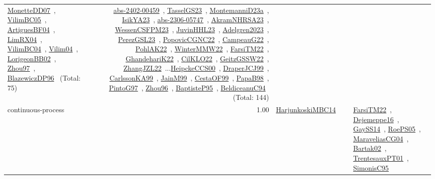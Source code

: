 {\begin{longtable}{p{3cm}r>{\raggedright\arraybackslash}p{6cm}>{\raggedright\arraybackslash}p{6cm}>{\raggedright\arraybackslash}p{8cm}}
\href{../works/MonetteDD07.pdf}{MonetteDD07}~\cite{MonetteDD07}, \href{../works/VilimBC05.pdf}{VilimBC05}~\cite{VilimBC05}, \href{../works/ArtiguesBF04.pdf}{ArtiguesBF04}~\cite{ArtiguesBF04}, \href{../works/LimRX04.pdf}{LimRX04}~\cite{LimRX04}, \href{../works/VilimBC04.pdf}{VilimBC04}~\cite{VilimBC04}, \href{../works/Vilim04.pdf}{Vilim04}~\cite{Vilim04}, \href{../works/LorigeonBB02.pdf}{LorigeonBB02}~\cite{LorigeonBB02}, \href{../works/Zhou97.pdf}{Zhou97}~\cite{Zhou97}, \href{../works/BlazewiczDP96.pdf}{BlazewiczDP96}~\cite{BlazewiczDP96} (Total: 75) & \href{../works/abs-2402-00459.pdf}{abs-2402-00459}~\cite{abs-2402-00459}, \href{../works/TasselGS23.pdf}{TasselGS23}~\cite{TasselGS23}, \href{../works/MontemanniD23a.pdf}{MontemanniD23a}~\cite{MontemanniD23a}, \href{../works/IsikYA23.pdf}{IsikYA23}~\cite{IsikYA23}, \href{../works/abs-2306-05747.pdf}{abs-2306-05747}~\cite{abs-2306-05747}, \href{../works/AkramNHRSA23.pdf}{AkramNHRSA23}~\cite{AkramNHRSA23}, \href{../works/WessenCSFPM23.pdf}{WessenCSFPM23}~\cite{WessenCSFPM23}, \href{../works/JuvinHHL23.pdf}{JuvinHHL23}~\cite{JuvinHHL23}, \href{../works/Adelgren2023.pdf}{Adelgren2023}~\cite{Adelgren2023}, \href{../works/PerezGSL23.pdf}{PerezGSL23}~\cite{PerezGSL23}, \href{../works/PopovicCGNC22.pdf}{PopovicCGNC22}~\cite{PopovicCGNC22}, \href{../works/CampeauG22.pdf}{CampeauG22}~\cite{CampeauG22}, \href{../works/PohlAK22.pdf}{PohlAK22}~\cite{PohlAK22}, \href{../works/WinterMMW22.pdf}{WinterMMW22}~\cite{WinterMMW22}, \href{../works/FarsiTM22.pdf}{FarsiTM22}~\cite{FarsiTM22}, \href{../works/GhandehariK22.pdf}{GhandehariK22}~\cite{GhandehariK22}, \href{../works/CilKLO22.pdf}{CilKLO22}~\cite{CilKLO22}, \href{../works/GeitzGSSW22.pdf}{GeitzGSSW22}~\cite{GeitzGSSW22}, \href{../works/ZhangJZL22.pdf}{ZhangJZL22}~\cite{ZhangJZL22}...\href{../works/HeipckeCCS00.pdf}{HeipckeCCS00}~\cite{HeipckeCCS00}, \href{../works/DraperJCJ99.pdf}{DraperJCJ99}~\cite{DraperJCJ99}, \href{../works/CarlssonKA99.pdf}{CarlssonKA99}~\cite{CarlssonKA99}, \href{../works/JainM99.pdf}{JainM99}~\cite{JainM99}, \href{../works/CestaOF99.pdf}{CestaOF99}~\cite{CestaOF99}, \href{../works/PapaB98.pdf}{PapaB98}~\cite{PapaB98}, \href{../works/PintoG97.pdf}{PintoG97}~\cite{PintoG97}, \href{../works/Zhou96.pdf}{Zhou96}~\cite{Zhou96}, \href{../works/BaptisteP95.pdf}{BaptisteP95}~\cite{BaptisteP95}, \href{../works/BeldiceanuC94.pdf}{BeldiceanuC94}~\cite{BeldiceanuC94} (Total: 144)\\
\index{continuous-process}\index{Concepts!continuous-process}continuous-process &  1.00 & \href{../works/HarjunkoskiMBC14.pdf}{HarjunkoskiMBC14}~\cite{HarjunkoskiMBC14} &  & \href{../works/FarsiTM22.pdf}{FarsiTM22}~\cite{FarsiTM22}, \href{../works/Dejemeppe16.pdf}{Dejemeppe16}~\cite{Dejemeppe16}, \href{../works/GaySS14.pdf}{GaySS14}~\cite{GaySS14}, \href{../works/RoePS05.pdf}{RoePS05}~\cite{RoePS05}, \href{../works/MaraveliasCG04.pdf}{MaraveliasCG04}~\cite{MaraveliasCG04}, \href{../works/Bartak02.pdf}{Bartak02}~\cite{Bartak02}, \href{../works/TrentesauxPT01.pdf}{TrentesauxPT01}~\cite{TrentesauxPT01}, \href{../works/SimonisC95.pdf}{SimonisC95}~\cite{SimonisC95}\\

\end{longtable}}
